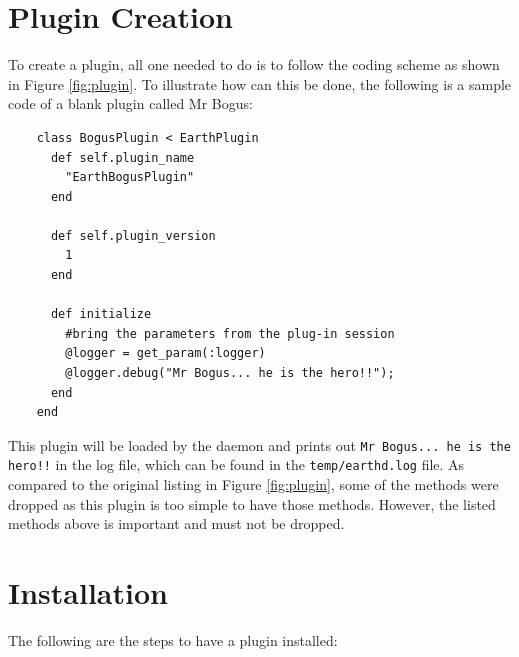 \documentclass{article}
\begin{document}
\section{Plugin Creation} %
\label{sec:plugin_creation}

To create a plugin, all one needed to do is to follow the coding scheme as shown in Figure \ref{fig:plugin}. To illustrate how can this be done, the following is a sample code of a blank plugin called Mr Bogus:

\begin{verbatim}
    class BogusPlugin < EarthPlugin
      def self.plugin_name
        "EarthBogusPlugin"
      end

      def self.plugin_version
        1
      end

      def initialize
        #bring the parameters from the plug-in session
        @logger = get_param(:logger)
        @logger.debug("Mr Bogus... he is the hero!!");
      end
    end    
\end{verbatim}

This plugin will be loaded by the daemon and prints out \texttt{Mr Bogus... he is the hero!!} in the log file, which can be found in the \texttt{temp/earthd.log} file. As compared to the original listing in Figure \ref{fig:plugin}, some of the methods were dropped as this plugin is too simple to have those methods. However, the listed methods above is important and must not be dropped. 


\section{Installation} %
\label{sec:installation}

The following are the steps to have a plugin installed:
\end{document}
